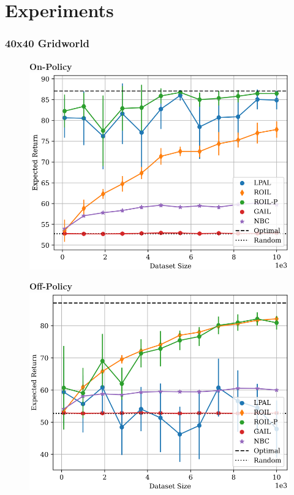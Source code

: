 \documentclass{beamer}
\begin{document}
\section*{Experiments}

\begin{frame}
\frametitle{40x40 Gridworld}
\begin{figure}
    \begin{minipage}{0.45\linewidth}
      \centering
      \textbf{On-Policy}
      \includegraphics[scale=0.4]{../../pres_roil/plots/returns/40x40_gridworld_on_policy_returns_cropped.pdf}
    \end{minipage}
    \hspace{0.06\linewidth}
    \begin{minipage}{0.45\linewidth}
      \centering
      \textbf{Off-Policy}
      \includegraphics[scale=0.4]{../../pres_roil/plots/returns/40x40_gridworld_off_policy_returns_cropped.pdf}
    \end{minipage}
\end{figure}
\end{frame}
\end{document}
